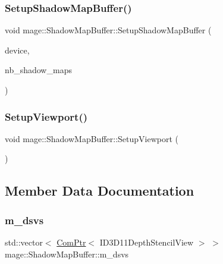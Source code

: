 \subsubsection{\texorpdfstring{Setup\+Shadow\+Map\+Buffer()}{SetupShadowMapBuffer()}}
{\footnotesize\ttfamily void mage\+::\+Shadow\+Map\+Buffer\+::\+Setup\+Shadow\+Map\+Buffer (\begin{DoxyParamCaption}\item[{I\+D3\+D11\+Device5 $\ast$}]{device,  }\item[{size\+\_\+t}]{nb\+\_\+shadow\+\_\+maps }\end{DoxyParamCaption})\hspace{0.3cm}{\ttfamily [private]}}

\hypertarget{structmage_1_1_shadow_map_buffer_aacabad92fb9c0bf81cf2f3c1fbae9f13}{}\label{structmage_1_1_shadow_map_buffer_aacabad92fb9c0bf81cf2f3c1fbae9f13} 
\subsubsection{\texorpdfstring{Setup\+Viewport()}{SetupViewport()}}
{\footnotesize\ttfamily void mage\+::\+Shadow\+Map\+Buffer\+::\+Setup\+Viewport (\begin{DoxyParamCaption}{ }\end{DoxyParamCaption})\hspace{0.3cm}{\ttfamily [private]}}



\subsection{Member Data Documentation}
\hypertarget{structmage_1_1_shadow_map_buffer_a36cb430d4da5bd380e66cf68bb0522c1}{}\label{structmage_1_1_shadow_map_buffer_a36cb430d4da5bd380e66cf68bb0522c1} 
\subsubsection{\texorpdfstring{m\+\_\+dsvs}{m\_dsvs}}
{\footnotesize\ttfamily std\+::vector$<$ \hyperlink{namespacemage_ae74f374780900893caa5555d1031fd79}{Com\+Ptr}$<$ I\+D3\+D11\+Depth\+Stencil\+View $>$ $>$ mage\+::\+Shadow\+Map\+Buffer\+::m\+\_\+dsvs\hspace{0.3cm}{\ttfamily [private]}}

